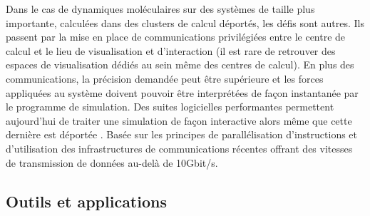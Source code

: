 Dans le cas de dynamiques moléculaires sur des systèmes de taille plus importante, calculées dans des clusters de calcul déportés, les défis sont autres. Ils passent par la mise en place de communications privilégiées entre le centre de calcul et le lieu de visualisation et d'interaction (il est rare de retrouver des espaces de visualisation dédiés au sein même des centres de calcul). En plus des communications, la précision demandée peut être supérieure et les forces appliquées au système doivent pouvoir être interprétées de façon instantanée par le programme de simulation. Des suites logicielles performantes permettent aujourd'hui de traiter une simulation de façon interactive alors même que cette dernière est déportée \cite{dreher2014exaviz}. Basée sur les principes de parallélisation d'instructions et d'utilisation des infrastructures de communications récentes offrant des vitesses de transmission de données au-delà de 10Gbit/s.


\subsection{Outils et applications}

